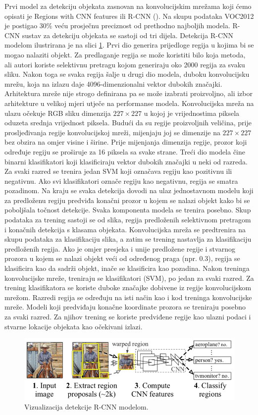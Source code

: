 Prvi model za detekciju objekata zasnovan na konvolucijskim mrežama koji ćemo opisati je Regions with CNN features ili R-CNN (\cite{DBLP:journals/corr/GirshickDDM13}). Na skupu podataka VOC2012 je postigao 30\% veću prosječnu preciznost od prethodno najboljih modela. 
R-CNN sustav za detekciju objekata se sastoji od tri dijela. Detekcija R-CNN modelom ilustrirana je na slici \ref{rcnn}. Prvi dio generira prijedloge regija u kojima bi se mogao nalaziti objekt. Za predlaganje regija se može koristiti bilo koja metoda, ali autori koriste selektivnu pretragu kojom generiraju oko 2000 regija za svaku sliku.
Nakon toga se svaka regija šalje u drugi dio modela, duboku konvolucijsku mrežu, koja na izlazu daje 4096-dimenzionalni vektor dubokih značajki. Arhitektura mreže nije strogo definirana pa se može izabrati proizvoljno, ali izbor arhitekture u velikoj mjeri utječe na performanse modela. Konvolucijska mreža na ulazu očekuje RGB sliku dimenzija $227 \times 227$ u kojoj je vrijednostima piksela oduzeta srednja vrijednost piksela. Budući da su regije proizvoljnih veličina, prije prosljeđivanja regije konvolucijskoj mreži, mijenjaju joj se dimenzije na $227 \times 227$ bez obzira na omjer visine i širine. Prije mijenjanja dimenzija regije, prozor koji određuje regiju se proširuje za 16 piksela sa svake strane.
Treći dio modela čine binarni klasifikatori koji klasificiraju vektor dubokih značajki u neki od razreda. Za svaki razred se trenira jedan SVM koji označava regiju kao pozitivnu ili negativnu. Ako svi klasifikatori označe regiju kao negativnu, regija se smatra pozadinom.
Na kraju se svaka detekcija dovodi na ulaz jednostavnom modelu koji za predloženu regiju predviđa konačni prozor u kojem se nalazi objekt kako bi se poboljšala točnost detekcije.
Svaka komponenta modela se trenira posebno. Skup podataka za trening sastoji se od slika, regija predloženih selektivnom pretragom i konačnih detekcija s klasama objekata.
Konvolucijska mreža se predtrenira na skupu podataka za klasifikaciju slika, a zatim se trening nastavlja za klasifikaciju predloženih regija. Ako je omjer presjeka i unije predložene regije i stvarnog prozora u kojem se nalazi objekt veći od određenog praga (npr. 0.3), regija se klasificira kao da sadrži objekt, inače se klasificira kao pozadina.
Nakon treninga konvolucijske mreže, treniraju se klasifikatori (SVM), po jedan za svaki razred. Za trening klasifikatora se koriste duboke značajke dobivene iz regije konvolucijskom mrežom. Razredi regija se određuju na isti način kao i kod treninga konvolucijske mreže.
Modeli koji predviđaju konačne koordinate prozora se treniraju posebno za svaki razred. Za njihov trening se koriste predviđene regije kao ulazni podaci i stvarne lokacije objekata kao očekivani izlazi.

 \begin{figure}
	\centering
	\includegraphics[scale=1]{img/rcnn.png}
	\caption{Vizualizacija detekcije R-CNN modelom.}
	\label{rcnn}
\end{figure}

